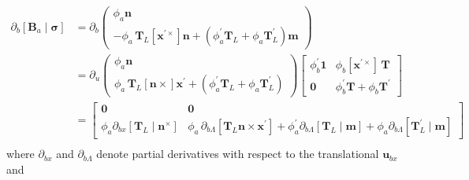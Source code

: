 \begin{equation*} 
   \begin{aligned}
   \partial_b\left[\bm{B}_a\mid\bm{\sigma}\right]
   &=\partial_b \begin{pmatrix}
   \phi_a \bm{n} \\
   -\phi_a \,\mathbf{T}_{\scriptscriptstyle{L}} [\bm{x}^{\prime\times}]\bm{n} + (\phi_a^\prime \mathbf{T}_{\scriptscriptstyle{L}}+ \phi_a\mathbf{T}_{\scriptscriptstyle{L}}^{\prime})\bm{m}
   \end{pmatrix} \\
   &=\partial_u \begin{pmatrix}
   \phi_a \bm{n} \\
   \phi_a \,\mathbf{T}_{\scriptscriptstyle{L}} [\bm{n}\times]\bm{x}^{\prime} + (\phi_a^\prime \mathbf{T}_{\scriptscriptstyle{L}}+ \phi_a\mathbf{T}_{\scriptscriptstyle{L}}^{\prime})%
   \end{pmatrix}\begin{bmatrix}
   \phi_b^\prime\mathbf{1} & \phi_b [\bm{x}^{\prime\times}] \,\mathbf{T} \\
   \mathbf{0} & \phi_b^\prime \mathbf{T}+ \phi_b\mathbf{T}^{\prime}
   \end{bmatrix} \\
   &= \begin{bmatrix}
   \mathbf{0} & \mathbf{0} \\
   \phi_a \partial_{b x}[\mathbf{T}_{\scriptscriptstyle{L}} \mid \bm{n}^\times] %
   &\phi_a \,\partial_{b \scriptscriptstyle{\Lambda}}  [\mathbf{T}_{\scriptscriptstyle{L}} \bm{n}\times\bm{x}^{\prime}] 
   + \phi_a^\prime \partial_{b \scriptscriptstyle{\Lambda}}  \left[\mathbf{T}_{\scriptscriptstyle{L}}\mid\bm{m}\right]+ \phi_a\partial_{b \scriptscriptstyle{\Lambda}}  [{\mathbf{T}_{\scriptscriptstyle{L}}^{\prime}}\mid\bm{m}]
   \end{bmatrix}\\
   \end{aligned}
\end{equation*}
%
where \(\partial_{b x}\) and
  \(\partial_{b \scriptscriptstyle{\Lambda}}\) denote partial
  derivatives with respect to the translational \(\bm{u}_{b x}\) and
